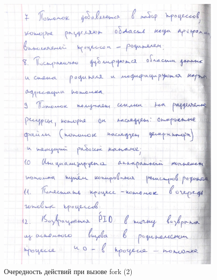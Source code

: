 \documentclass[12pt]{report}
\begin{document}
\begin{figure}[H]

	\centering

	\includegraphics[width=\linewidth]{img/fork_2.png}
	\caption{Очередность действий при вызове fork (2)}

\end{figure}
\end{document}
